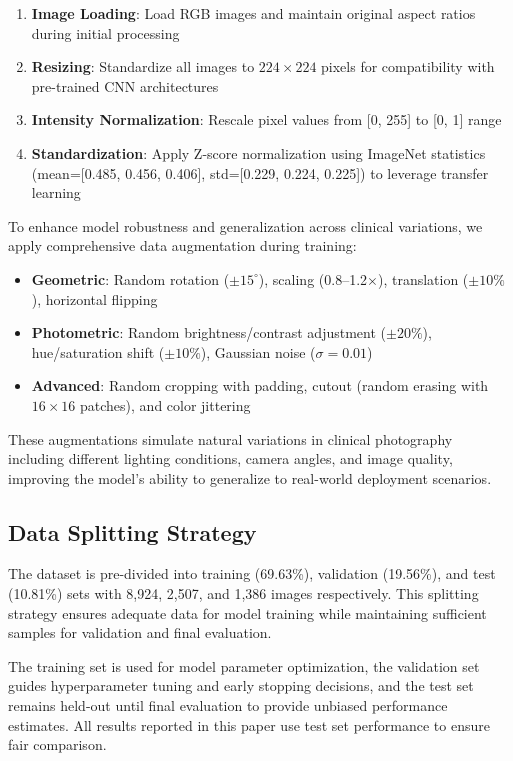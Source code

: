 \begin{enumerate}
    \item \textbf{Image Loading}: Load RGB images and maintain original aspect ratios during initial processing
    \item \textbf{Resizing}: Standardize all images to $224\times224$ pixels for compatibility with pre-trained CNN architectures
    \item \textbf{Intensity Normalization}: Rescale pixel values from [0, 255] to [0, 1] range
    \item \textbf{Standardization}: Apply Z-score normalization using ImageNet statistics (mean=[0.485, 0.456, 0.406], std=[0.229, 0.224, 0.225]) to leverage transfer learning
\end{enumerate}

To enhance model robustness and generalization across clinical variations, we apply comprehensive data augmentation during training:

\begin{itemize}
    \item \textbf{Geometric}: Random rotation ($\pm 15^{\circ}$), scaling (0.8--1.2$\times$), translation ($\pm 10\%$), horizontal flipping
    \item \textbf{Photometric}: Random brightness/contrast adjustment ($\pm 20\%$), hue/saturation shift ($\pm 10\%$), Gaussian noise ($\sigma=0.01$)
    \item \textbf{Advanced}: Random cropping with padding, cutout (random erasing with $16\times16$ patches), and color jittering
\end{itemize}

These augmentations simulate natural variations in clinical photography including different lighting conditions, camera angles, and image quality, improving the model's ability to generalize to real-world deployment scenarios.

\subsection{Data Splitting Strategy}

The dataset is pre-divided into training (69.63\%), validation (19.56\%), and test (10.81\%) sets with 8,924, 2,507, and 1,386 images respectively. This splitting strategy ensures adequate data for model training while maintaining sufficient samples for validation and final evaluation.

The training set is used for model parameter optimization, the validation set guides hyperparameter tuning and early stopping decisions, and the test set remains held-out until final evaluation to provide unbiased performance estimates. All results reported in this paper use test set performance to ensure fair comparison.

